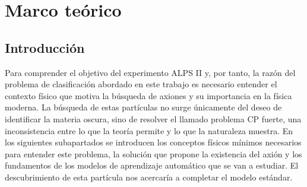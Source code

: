 %
%
%
% 
%
%
%
%

\chapter{Marco teórico}
\label{cha:Marco-teorico}

\begin{FraseCelebre}
  \begin{Frase}
    
  \end{Frase}
  \begin{Fuente}
    
  \end{Fuente}
\end{FraseCelebre}


\section{Introducción}
\label{sec:introduccion}

Para comprender el objetivo del experimento ALPS II y, por tanto, la razón del problema de clasificación abordado en este trabajo es necesario entender el contexto físico que motiva la búsqueda de axiones y su importancia en la física moderna. La búsqueda de estas partículas no surge únicamente del deseo de identificar la materia oscura, sino de resolver el llamado problema CP fuerte, una inconsistencia entre lo que la teoría permite y lo que la naturaleza muestra.
En los siguientes subapartados se introducen los conceptos físicos mínimos necesarios para entender este problema, la solución que propone la existencia del axión y los fundamentos de los modelos de aprendizaje automático que se van a estudiar. El descubrimiento de esta partícula nos acercaría a completar el modelo estándar.

